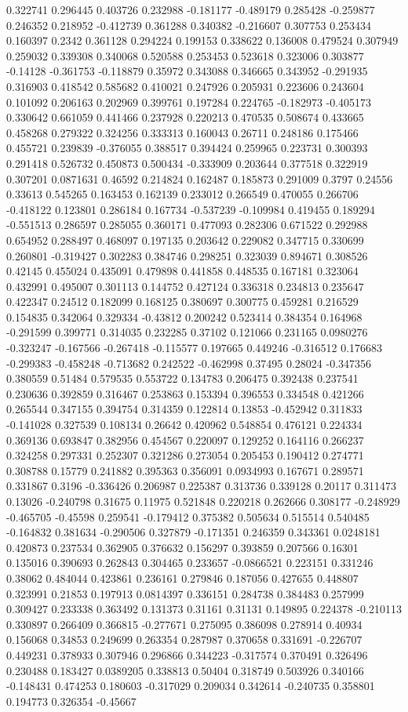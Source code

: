 0.322741 0.296445 0.403726 0.232988 -0.181177 -0.489179 0.285428 -0.259877 0.246352 0.218952 -0.412739 0.361288 0.340382 -0.216607 0.307753 0.253434 0.160397 0.2342 0.361128 0.294224 0.199153 0.338622 0.136008 0.479524 0.307949 0.259032 0.339308 0.340068 0.520588 0.253453 0.523618 0.323006 0.303877 -0.14128 -0.361753 -0.118879 0.35972 0.343088 0.346665 0.343952 -0.291935 0.316903 0.418542 0.585682 0.410021 0.247926 0.205931 0.223606 0.243604 0.101092 0.206163 0.202969 0.399761 0.197284 0.224765 -0.182973 -0.405173 0.330642 0.661059 0.441466 0.237928 0.220213 0.470535 0.508674 0.433665 0.458268 0.279322 0.324256 0.333313 0.160043 0.26711 0.248186 0.175466 0.455721 0.239839 -0.376055 0.388517 0.394424 0.259965 0.223731 0.300393 0.291418 0.526732 0.450873 0.500434 -0.333909 0.203644 0.377518 0.322919 0.307201 0.0871631 0.46592 0.214824 0.162487 0.185873 0.291009 0.3797 0.24556 0.33613 0.545265 0.163453 0.162139 0.233012 0.266549 0.470055 0.266706 -0.418122 0.123801 0.286184 0.167734 -0.537239 -0.109984 0.419455 0.189294 -0.551513 0.286597 0.285055 0.360171 0.477093 0.282306 0.671522 0.292988 0.654952 0.288497 0.468097 0.197135 0.203642 0.229082 0.347715 0.330699 0.260801 -0.319427 0.302283 0.384746 0.298251 0.323039 0.894671 0.308526 0.42145 0.455024 0.435091 0.479898 0.441858 0.448535 0.167181 0.323064 0.432991 0.495007 0.301113 0.144752 0.427124 0.336318 0.234813 0.235647 0.422347 0.24512 0.182099 0.168125 0.380697 0.300775 0.459281 0.216529 0.154835 0.342064 0.329334 -0.43812 0.200242 0.523414 0.384354 0.164968 -0.291599 0.399771 0.314035 0.232285 0.37102 0.121066 0.231165 0.0980276 -0.323247 -0.167566 -0.267418 -0.115577 0.197665 0.449246 -0.316512 0.176683 -0.299383 -0.458248 -0.713682 0.242522 -0.462998 0.37495 0.28024 -0.347356 0.380559 0.51484 0.579535 0.553722 0.134783 0.206475 0.392438 0.237541 0.230636 0.392859 0.316467 0.253863 0.153394 0.396553 0.334548 0.421266 0.265544 0.347155 0.394754 0.314359 0.122814 0.13853 -0.452942 0.311833 -0.141028 0.327539 0.108134 0.26642 0.420962 0.548854 0.476121 0.224334 0.369136 0.693847 0.382956 0.454567 0.220097 0.129252 0.164116 0.266237 0.324258 0.297331 0.252307 0.321286 0.273054 0.205453 0.190412 0.274771 0.308788 0.15779 0.241882 0.395363 0.356091 0.0934993 0.167671 0.289571 0.331867 0.3196 -0.336426 0.206987 0.225387 0.313736 0.339128 0.20117 0.311473 0.13026 -0.240798 0.31675 0.11975 0.521848 0.220218 0.262666 0.308177 -0.248929 -0.465705 -0.45598 0.259541 -0.179412 0.375382 0.505634 0.515514 0.540485 -0.164832 0.381634 -0.290506 0.327879 -0.171351 0.246359 0.343361 0.0248181 0.420873 0.237534 0.362905 0.376632 0.156297 0.393859 0.207566 0.16301 0.135016 0.390693 0.262843 0.304465 0.233657 -0.0866521 0.223151 0.331246 0.38062 0.484044 0.423861 0.236161 0.279846 0.187056 0.427655 0.448807 0.323991 0.21853 0.197913 0.0814397 0.336151 0.284738 0.384483 0.257999 0.309427 0.233338 0.363492 0.131373 0.31161 0.31131 0.149895 0.224378 -0.210113 0.330897 0.266409 0.366815 -0.277671 0.275095 0.386098 0.278914 0.40934 0.156068 0.34853 0.249699 0.263354 0.287987 0.370658 0.331691 -0.226707 0.449231 0.378933 0.307946 0.296866 0.344223 -0.317574 0.370491 0.326496 0.230488 0.183427 0.0389205 0.338813 0.50404 0.318749 0.503926 0.340166 -0.148431 0.474253 0.180603 -0.317029 0.209034 0.342614 -0.240735 0.358801 0.194773 0.326354 -0.45667 